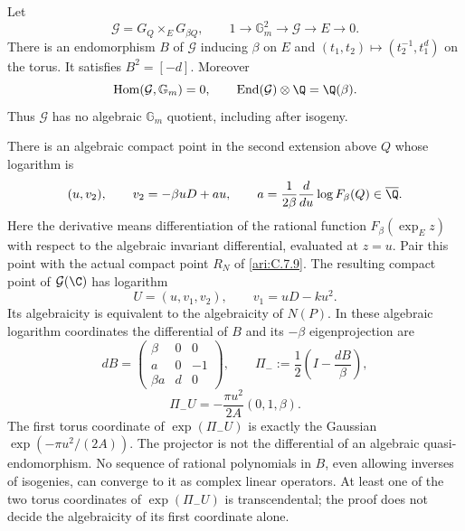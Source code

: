 \begin{proposition}\hypertarget{tag-0018}{}\label{ari:C.7.10}

Let
\[
 \mathcal G=G_Q\mathbin{\times_E}G_{\beta Q},\qquad
 1\longrightarrow\mathbb G_m^2\longrightarrow\mathcal G
       \longrightarrow E\longrightarrow0.
\]
There is an endomorphism $B$ of $\mathcal G$ inducing
$\beta$ on $E$ and
$(t_1,t_2)\mapsto(t_2^{-1},t_1^d)$ on the torus.
It satisfies $B^2=[-d]$. Moreover
\[
 \operatorname{Hom}(\mathcal G,\mathbb G_m)=0,
 \qquad
 \operatorname{End}(\mathcal G)\otimes\Q=\Q(\beta).
\]
Thus $\mathcal G$ has no algebraic $\mathbb G_m$ quotient,
including after isogeny.

There is an algebraic compact point in the second extension
above $Q$ whose logarithm is
\[
 (u,v_2),\qquad v_2=-\beta uD+au,
 \qquad
 a=\frac1{2\beta}
       \frac{d}{du}\log F_\beta(Q)\in\overline\Q.
\]
Here the derivative means differentiation of the rational
function $F_\beta(\exp_E z)$ with respect to the algebraic
invariant differential, evaluated at $z=u$.
Pair this point with the actual compact point $R_N$ of
\ref{ari:C.7.9}. The resulting compact point of $\mathcal G(\C)$
has logarithm
\[
 U=(u,v_1,v_2),\qquad v_1=uD-ku^2.
\]
Its algebraicity is equivalent to the algebraicity of $N(P)$.
In these algebraic logarithm coordinates the differential of
$B$ and its $-\beta$ eigenprojection are
\[
 dB=\begin{pmatrix}
 \beta&0&0\\ a&0&-1\\ \beta a&d&0
 \end{pmatrix},\qquad
 \Pi_-:=\frac12\left(I-\frac{dB}{\beta}\right),
\]
\[
 \Pi_-U=-\frac{\pi u^2}{2A}(0,1,\beta).
\]
The first torus coordinate of $\exp(\Pi_-U)$ is exactly
the Gaussian $\exp(-\pi u^2/(2A))$. The projector is not
the differential of an algebraic quasi-endomorphism. No
sequence of rational polynomials in $B$, even allowing
inverses of isogenies, can converge to it as complex linear
operators. At least one of the two torus coordinates of
$\exp(\Pi_-U)$ is transcendental; the proof does not decide the
algebraicity of its first coordinate alone.
\end{proposition}


